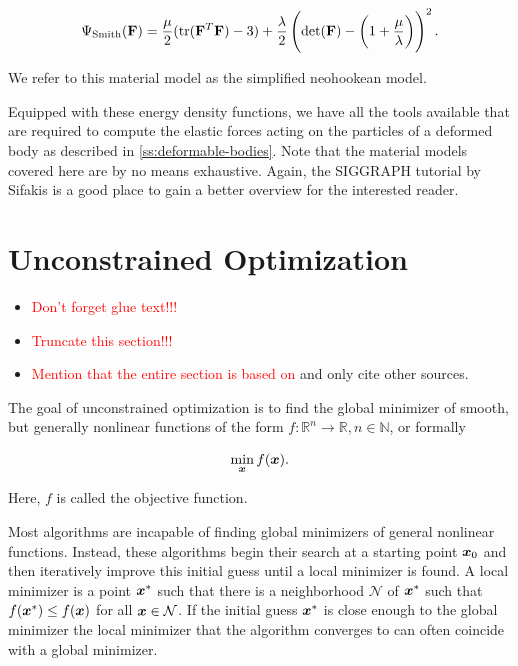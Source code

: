 \begin{equation}\label{eq:smith-neohookean-material-model}
    \Psi_{\text{Smith}}(\mathbf{F}) = \frac{\mu}{2}(\text{tr}(\mathbf{F}^T\mathbf{F}) - 3) + \frac{\lambda}{2}\left(\text{det}(\mathbf{F}) - 
    \left(1 + \frac{\mu}{\lambda}\right)\right)^2.
\end{equation}

\noindent We refer to this material model as the simplified neohookean model.

Equipped with these energy density functions, we have all the tools available that are required to compute the elastic forces acting on the particles 
of a deformed body as described in \cref{ss:deformable-bodies}. Note that the material models covered here are by no means exhaustive. Again, the 
SIGGRAPH tutorial by Sifakis \cite{sifakis2012} is a good place to gain a better overview for the interested reader.

\section{Unconstrained Optimization}\label{s:unconstrained-optimization}
\begin{itemize}
    \item \textcolor{red}{Don't forget glue text!!!}
    \item \textcolor{red}{Truncate this section!!!}
    \item \textcolor{red}{Mention that the entire section is based on \cite{nocedal2006}} and only cite other sources.
\end{itemize}

The goal of unconstrained optimization is to find the global minimizer of smooth, but generally nonlinear functions of the form $f \colon 
\mathbb{R}^n \to \mathbb{R}, n \in \mathbb{N}$, or formally

\[
    \min_{\bm{x}} f(\bm{x}).
\]

\noindent Here, $f$ is called the objective function. 

Most algorithms are incapable of finding global minimizers of general nonlinear functions. 
Instead, these algorithms begin their search at a starting point $\bm{x}_0$ and then iteratively improve this initial guess until a local 
minimizer is found. A local minimizer is a point $\bm{x}^*$ such that there is a neighborhood $\mathcal{N}$ of 
$\bm{x}^*$ such that $f(\bm{x}^*) \leq f(\bm{x})$ for all $\bm{x} \in \mathcal{N}$. If the initial guess $\bm{x}^*$ is close enough 
to the global minimizer the local minimizer that the algorithm converges to can often coincide with a global minimizer. 

